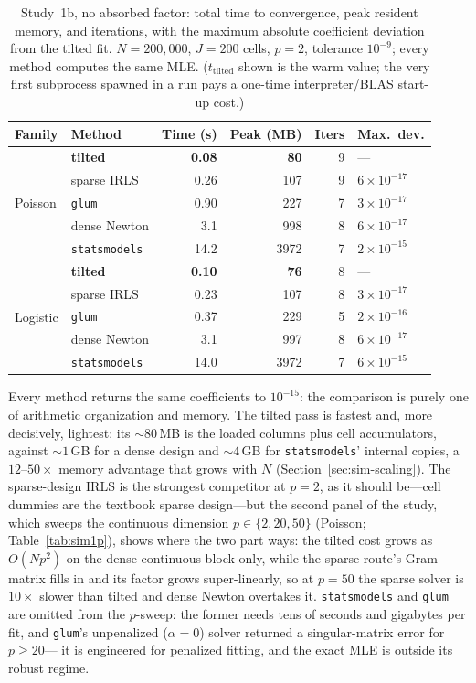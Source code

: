 \documentclass[11pt]{article}
\begin{document}
\begin{table}[t]
\centering
\caption{Study~1b, no absorbed factor: total time to convergence, peak
resident memory, and iterations, with the maximum absolute
coefficient deviation from the tilted fit.  $N = 200{,}000$,
$J = 200$ cells, $p = 2$, tolerance $10^{-9}$; every method computes the
same MLE.  ($t_{\text{tilted}}$ shown is the warm value; the very first
subprocess spawned in a run pays a one-time interpreter/BLAS start-up
cost.)}
\label{tab:sim1b}
\small
\begin{tabular}{llrrrl}
\toprule
Family & Method & Time (s) & Peak (MB) & Iters & Max.\ dev. \\
\midrule
\multirow{5}{*}{Poisson}
 & \textbf{tilted}      & \textbf{0.08} & \textbf{80}   & 9 & --- \\
 & sparse IRLS          & 0.26 & 107  & 9 & $6\times10^{-17}$ \\
 & \texttt{glum}        & 0.90 & 227  & 7 & $3\times10^{-17}$ \\
 & dense Newton         & 3.1  & 998  & 8 & $6\times10^{-17}$ \\
 & \texttt{statsmodels} & 14.2 & 3972 & 7 & $2\times10^{-15}$ \\
\midrule
\multirow{5}{*}{Logistic}
 & \textbf{tilted}      & \textbf{0.10} & \textbf{76}   & 8 & --- \\
 & sparse IRLS          & 0.23 & 107  & 8 & $3\times10^{-17}$ \\
 & \texttt{glum}        & 0.37 & 229  & 5 & $2\times10^{-16}$ \\
 & dense Newton         & 3.1  & 997  & 8 & $6\times10^{-17}$ \\
 & \texttt{statsmodels} & 14.0 & 3972 & 7 & $6\times10^{-15}$ \\
\bottomrule
\end{tabular}
\end{table}

Every method returns the same coefficients to $10^{-15}$: the comparison
is purely one of arithmetic organization and memory.  The tilted pass is
fastest and, more decisively, lightest: its $\sim\!80$\,MB is the loaded
columns plus cell accumulators, against $\sim\!1$\,GB for a dense design
and $\sim\!4$\,GB for \texttt{statsmodels}' internal copies, a $12$--$50\times$
memory advantage that grows with $N$ (Section~\ref{sec:sim-scaling}).
The sparse-design IRLS is the strongest competitor at $p = 2$, as it
should be---cell dummies are the textbook sparse design---but the second
panel of the study, which sweeps the continuous dimension
$p \in \{2, 20, 50\}$ (Poisson; Table~\ref{tab:sim1p}), shows where the
two part ways: the tilted cost grows as $O(Np^2)$ on the dense continuous
block only, while the sparse route's Gram matrix fills in and its factor
grows super-linearly, so at $p = 50$ the sparse solver is $10\times$
slower than tilted and dense Newton overtakes it.  \texttt{statsmodels}
and \texttt{glum} are omitted from the $p$-sweep: the former needs tens
of seconds and gigabytes per fit, and \texttt{glum}'s unpenalized
($\alpha = 0$) solver returned a singular-matrix error for $p \ge 20$---%
it is engineered for penalized fitting, and the exact MLE is outside its
robust regime.
\end{document}
